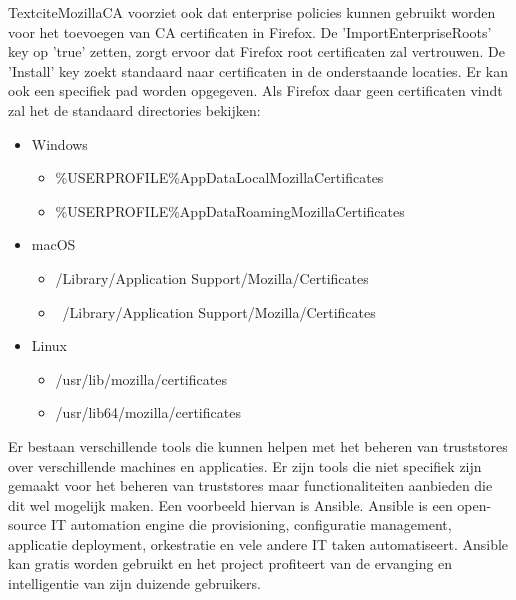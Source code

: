 Textcite{MozillaCA} voorziet ook dat enterprise policies kunnen gebruikt worden voor het toevoegen van CA certificaten in Firefox.
De 'ImportEnterpriseRoots' key op 'true' zetten, zorgt ervoor dat Firefox root certificaten zal vertrouwen.
De 'Install' key zoekt standaard naar certificaten in de onderstaande locaties. Er kan ook een specifiek pad worden opgegeven. Als Firefox daar geen certificaten vindt zal het de standaard directories bekijken:
\begin{itemize}
  \item Windows
  \begin{itemize}
    \item \%USERPROFILE\%AppDataLocalMozillaCertificates 
    \item \%USERPROFILE\%AppDataRoamingMozillaCertificates
  \end{itemize}

  \item macOS
  \begin{itemize}
    \item /Library/Application Support/Mozilla/Certificates 
    \item ~/Library/Application Support/Mozilla/Certificates 
  \end{itemize}

  \item Linux 
  \begin{itemize}
    \item /usr/lib/mozilla/certificates 
    \item /usr/lib64/mozilla/certificates 
  \end{itemize}
\end{itemize} \autocite{MozillaCA} \break

\label{sec:Bestaande tools}

Er bestaan verschillende tools die kunnen helpen met het beheren van truststores over verschillende machines en applicaties.
Er zijn tools die niet specifiek zijn gemaakt voor het beheren van truststores maar functionaliteiten aanbieden die dit wel mogelijk maken.
Een voorbeeld hiervan is Ansible.
Ansible is een open-source IT automation engine die provisioning, configuratie management, applicatie deployment, orkestratie en vele andere IT taken automatiseert.
Ansible kan gratis worden gebruikt en het project profiteert van de ervanging en intelligentie van zijn duizende gebruikers. \autocite{Ansible}

